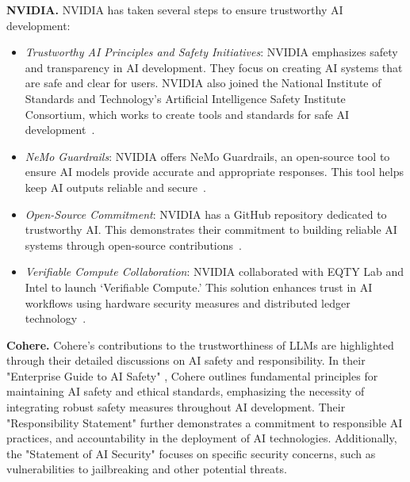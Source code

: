 \textbf{NVIDIA.} NVIDIA has taken several steps to ensure trustworthy AI development:

\begin{itemize}[nolistsep, leftmargin=15pt]
    \item[] \textcolor[HTML]{76B900}{\largedot} {\textit{Trustworthy AI Principles and Safety Initiatives}:} NVIDIA emphasizes safety and transparency in AI development. They focus on creating AI systems that are safe and clear for users. NVIDIA also joined the National Institute of Standards and Technology's Artificial Intelligence Safety Institute Consortium, which works to create tools and standards for safe AI development~\cite{nvidiaTrustworthyAI}. 
    \item[] \textcolor[HTML]{76B900}{\largedot} {\textit{NeMo Guardrails}:} NVIDIA offers NeMo Guardrails, an open-source tool to ensure AI models provide accurate and appropriate responses. This tool helps keep AI outputs reliable and secure~\cite{nvidiaTrustworthyAI}.
    \item[] \textcolor[HTML]{76B900}{\largedot} {\textit{Open-Source Commitment}:} NVIDIA has a GitHub repository dedicated to trustworthy AI. This demonstrates their commitment to building reliable AI systems through open-source contributions~\cite{nvidiaTrustworthyAIRepo}.
    \item[] \textcolor[HTML]{76B900}{\largedot} {\textit{Verifiable Compute Collaboration}:} NVIDIA collaborated with EQTY Lab and Intel to launch `Verifiable Compute.' This solution enhances trust in AI workflows using hardware security measures and distributed ledger technology~\cite{eqtyLabIntelNvidiaAITrust}.
\end{itemize}

\textbf{Cohere.} Cohere's contributions to the trustworthiness of LLMs are highlighted through their detailed discussions on AI safety and responsibility. In their "Enterprise Guide to AI Safety" \cite{cohere2024enterprise}, Cohere outlines fundamental principles for maintaining AI safety and ethical standards, emphasizing the necessity of integrating robust safety measures throughout AI development. Their "Responsibility Statement" \cite{cohere2024responsibility} further demonstrates a commitment to responsible AI practices, and accountability in the deployment of AI technologies. Additionally, the "Statement of AI Security" \cite{cohere2024stateofai} focuses on specific security concerns, such as vulnerabilities to jailbreaking and other potential threats.


